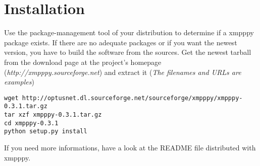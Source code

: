 \chapter{Installation}



Use the package-management tool of your distribution to determine if a xmpppy package exists.
If there are no adequate packages or if you want the newest version, you have to build the software from the sources.
\newline
Get the newest tarball from the download page at the project's homepage (\textit{http://xmpppy.sourceforge.net}) and extract it (\textit{The filenames and URLs are examples})
\begin{verbatim}
wget http://optusnet.dl.sourceforge.net/sourceforge/xmpppy/xmpppy-0.3.1.tar.gz
tar xzf xmpppy-0.3.1.tar.gz
cd xmpppy-0.3.1
python setup.py install
\end{verbatim}
If you need more informations, have a look at the README file distributed with xmpppy.


